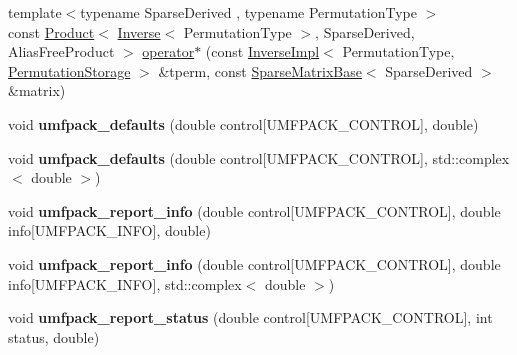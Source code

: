 \begin{DoxyCompactItemize}
\item 
{\footnotesize template$<$typename Sparse\+Derived , typename Permutation\+Type $>$ }\\const \hyperlink{group___core___module_class_eigen_1_1_product}{Product}$<$ \hyperlink{class_eigen_1_1_inverse}{Inverse}$<$ Permutation\+Type $>$, Sparse\+Derived, Alias\+Free\+Product $>$ \hyperlink{namespace_eigen_a8908bda30ef10657db0653d96ad5800e}{operator$\ast$} (const \hyperlink{class_eigen_1_1_inverse_impl}{Inverse\+Impl}$<$ Permutation\+Type, \hyperlink{struct_eigen_1_1_permutation_storage}{Permutation\+Storage} $>$ \&tperm, const \hyperlink{group___sparse_core___module_class_eigen_1_1_sparse_matrix_base}{Sparse\+Matrix\+Base}$<$ Sparse\+Derived $>$ \&matrix)
\item 
\mbox{\label{namespace_eigen_a75e48c6119284de964509f198c360d80}} 
void {\bfseries umfpack\+\_\+defaults} (double control\mbox{[}U\+M\+F\+P\+A\+C\+K\+\_\+\+C\+O\+N\+T\+R\+OL\mbox{]}, double)
\item 
\mbox{\label{namespace_eigen_aa155e670ec3198796812ac9e422c8c72}} 
void {\bfseries umfpack\+\_\+defaults} (double control\mbox{[}U\+M\+F\+P\+A\+C\+K\+\_\+\+C\+O\+N\+T\+R\+OL\mbox{]}, std\+::complex$<$ double $>$)
\item 
\mbox{\label{namespace_eigen_a25a6fdf620af7c977817c2d84f607813}} 
void {\bfseries umfpack\+\_\+report\+\_\+info} (double control\mbox{[}U\+M\+F\+P\+A\+C\+K\+\_\+\+C\+O\+N\+T\+R\+OL\mbox{]}, double info\mbox{[}U\+M\+F\+P\+A\+C\+K\+\_\+\+I\+N\+FO\mbox{]}, double)
\item 
\mbox{\label{namespace_eigen_aa5efb1f261b635a37c1eda976dbae3eb}} 
void {\bfseries umfpack\+\_\+report\+\_\+info} (double control\mbox{[}U\+M\+F\+P\+A\+C\+K\+\_\+\+C\+O\+N\+T\+R\+OL\mbox{]}, double info\mbox{[}U\+M\+F\+P\+A\+C\+K\+\_\+\+I\+N\+FO\mbox{]}, std\+::complex$<$ double $>$)
\item 
\mbox{\label{namespace_eigen_a2e5e77d53251e6219857d58cfb7ea42f}} 
void {\bfseries umfpack\+\_\+report\+\_\+status} (double control\mbox{[}U\+M\+F\+P\+A\+C\+K\+\_\+\+C\+O\+N\+T\+R\+OL\mbox{]}, int status, double)
\item 
\mbox{\label{namespace_eigen_a1a939abd553847ad5b0412a521215a53}} 

\end{DoxyCompactItemize}
